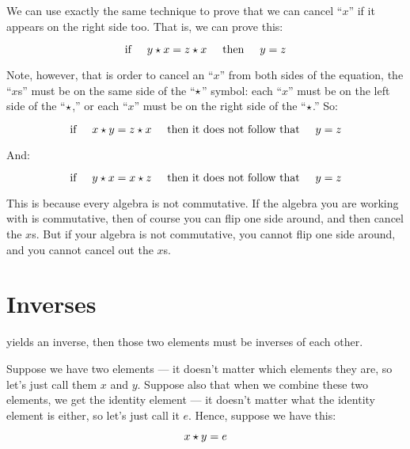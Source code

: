 \documentclass[../../../main.tex]{subfiles}
\begin{document}
We can use exactly the same technique to prove that we can cancel ``$x$'' if it appears on the right side too. That is, we can prove this:

\begin{equation*}
  \text{if} \hskip 0.5cm 
  \op{y}{x} = \op{z}{x} \hskip 0.5cm 
  \text{then} \hskip 0.5cm  
  y = z
\end{equation*}

Note, however, that is order to cancel an ``$x$'' from both sides of the equation, the ``$x$s'' must be on the same side of the ``$\opSymbol/$'' symbol: each ``$x$'' must be on the left side of the ``$\opSymbol/$,'' or each ``$x$'' must be on the right side of the ``$\opSymbol/$.'' So:

\begin{equation*}
  \text{if} \hskip 0.5cm
  \op{x}{y} = \op{z}{x} \hskip 0.5cm 
  \text{then it does not follow that} \hskip 0.5cm  
  y = z
\end{equation*}

And:

\begin{equation*}
  \text{if} \hskip 0.5cm 
  \op{y}{x} = \op{x}{z} \hskip 0.5cm 
  \text{then it does not follow that} \hskip 0.5cm  
  y = z
\end{equation*}

This is because every algebra is not commutative. If the algebra you are working with is commutative, then of course you can flip one side around, and then cancel the $x$s. But if your algebra is not commutative, you cannot flip one side around, and you cannot cancel out the $x$s.


\section{Inverses}

 yields an inverse, then those two elements must be inverses of each other. 

Suppose we have two elements --- it doesn't matter which elements they are, so let's just call them $x$ and $y$. Suppose also that when we combine these two elements, we get the identity element --- it doesn't matter what the identity element is either, so let's just call it $e$. Hence, suppose we have this:

\begin{equation*}
  \op{x}{y} = e
\end{equation*}
\end{document}

